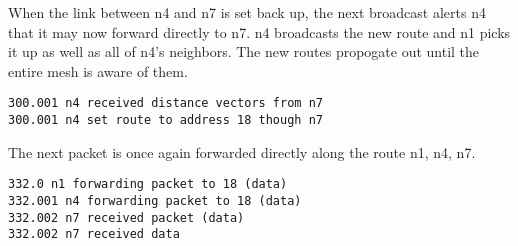 \documentclass[11pt]{article}
\begin{document}
\vspace{5mm}

When the link between n4 and n7 is set back up, the next broadcast alerts n4 that it may now forward directly to n7. n4 broadcasts the new route and n1 picks it up as well as all of n4's neighbors. The new routes propogate out until the entire mesh is aware of them.

\vspace{5mm}

\begin{lstlisting}
300.001 n4 received distance vectors from n7
300.001 n4 set route to address 18 though n7
\end{lstlisting}

\vspace{5mm}

The next packet is once again forwarded directly along the route n1, n4, n7.

\vspace{5mm}

\begin{lstlisting}
332.0 n1 forwarding packet to 18 (data)
332.001 n4 forwarding packet to 18 (data)
332.002 n7 received packet (data)
332.002 n7 received data
\end{lstlisting}

\vspace{5mm}

\vspace{5mm}
\end{document}

